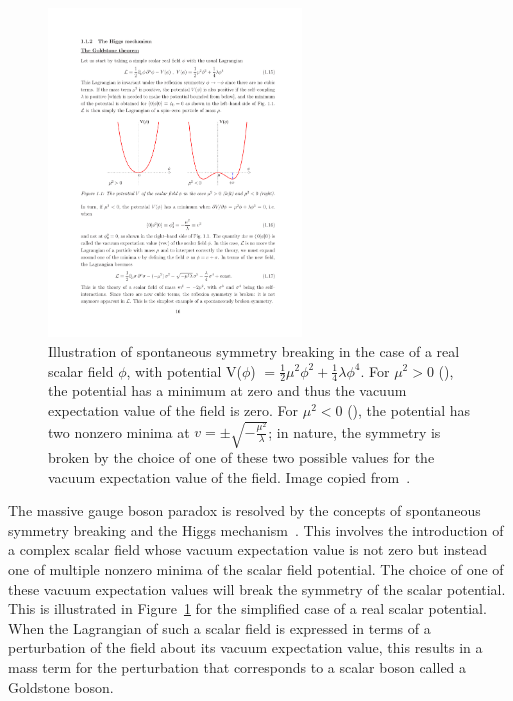\begin{figure}
   \begin{center}
      \includegraphics[width=0.6\textwidth]{figures/intro-Higgspotential}
      \caption{Illustration of spontaneous symmetry breaking in the case of a real scalar field $\phi$, with potential V($\phi$) $= \frac{1}{2}\mu^2\phi^2 + \frac{1}{4}\lambda\phi^4$. For $\mu^2 > 0$ (\cmsLeft), the potential has a minimum at zero and thus the vacuum expectation value of the field is zero. For $\mu^2 < 0$ (\cmsRight), the potential has two nonzero minima at $v = \pm\sqrt{-\frac{\mu^2}{\lambda}}$; in nature, the symmetry is broken by the choice of one of these two possible values for the vacuum expectation value of the field. Image copied from~\cite{Djouadi:2005gi}.}
      \label{fig:higgspotential}
   \end{center}
\end{figure}

The massive gauge boson paradox is resolved by the concepts of spontaneous symmetry breaking and the Higgs mechanism~\cite{ThomsonPhysics}. This involves the introduction of a complex scalar field whose vacuum expectation value is not zero but instead one of multiple nonzero minima of the scalar field potential. The choice of one of these vacuum expectation values will break the symmetry of the scalar potential. This is illustrated in Figure~\ref{fig:higgspotential} for the simplified case of a real scalar potential. When the Lagrangian of such a scalar field is expressed in terms of a perturbation of the field about its vacuum expectation value, this results in a mass term for the perturbation that corresponds to a scalar boson called a Goldstone boson.

